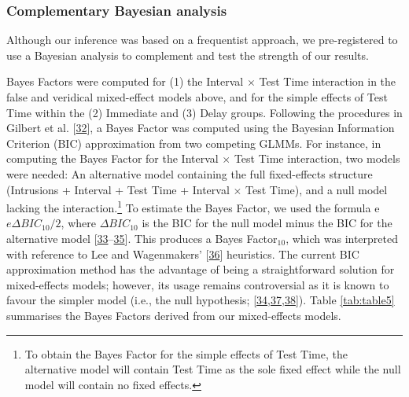 \documentclass[
]{article}
\begin{document}
\hypertarget{complementary-bayesian-analysis}{%
\subsubsection{Complementary Bayesian analysis}\label{complementary-bayesian-analysis}}

Although our inference was based on a frequentist approach, we pre-registered to use a Bayesian analysis to complement and test the strength of our results.

Bayes Factors were computed for (1) the Interval \(\times\) Test Time interaction in the false and veridical mixed-effect models above, and for the simple effects of Test Time within the (2) Immediate and (3) Delay groups. Following the procedures in Gilbert et al. {[}\protect\hyperlink{ref-gilbert2018a}{32}{]}, a Bayes Factor was computed using the Bayesian Information Criterion (BIC) approximation from two competing GLMMs. For instance, in computing the Bayes Factor for the Interval \(\times\) Test Time interaction, two models were needed: An alternative model containing the full fixed-effects structure (Intrusions + Interval + Test Time + Interval \(\times\) Test Time), and a null model lacking the interaction.\footnote{To obtain the Bayes Factor for the simple effects of Test Time, the alternative model will contain Test Time as the sole fixed effect while the null model will contain no fixed effects.} To estimate the Bayes Factor, we used the formula e \(e{\Delta BIC_{10}/2}\), where \(\Delta BIC_{10}\) is the BIC for the null model minus the BIC for the alternative model {[}\protect\hyperlink{ref-masson2011a}{33}--\protect\hyperlink{ref-wagenmakers2007a}{35}{]}. This produces a Bayes Factor\(_{10}\), which was interpreted with reference to Lee and Wagenmakers' {[}\protect\hyperlink{ref-lee2014a}{36}{]} heuristics. The current BIC approximation method has the advantage of being a straightforward solution for mixed-effects models; however, its usage remains controversial as it is known to favour the simpler model (i.e., the null hypothesis; {[}\protect\hyperlink{ref-lindelov2018a}{34},\protect\hyperlink{ref-vandekerckhove2014a}{37},\protect\hyperlink{ref-weakliem1999a}{38}{]}). Table \ref{tab:table5} summarises the Bayes Factors derived from our mixed-effects models.
\end{document}
